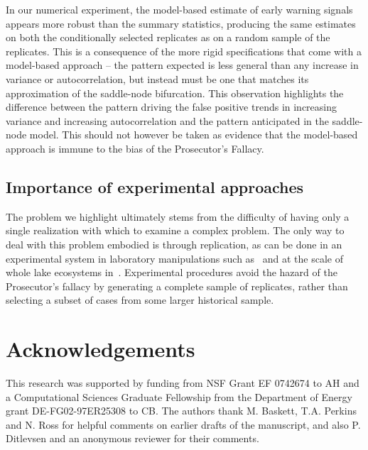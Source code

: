 \documentclass[authoryear,review,12pt]{elsarticle}
\begin{document}
In our numerical experiment, the model-based estimate of early warning
signals appears more robust than the summary statistics, producing
the same estimates on both the conditionally selected replicates as on
a random sample of the replicates.  This is a consequence of the more
rigid specifications that come with a model-based approach -- the pattern
expected is less general than any increase in variance or autocorrelation,
but instead must be one that matches its approximation of the saddle-node
bifurcation. This observation highlights the difference between the
pattern driving the false positive trends in increasing variance and
increasing autocorrelation and the pattern anticipated in the saddle-node
model. This should not however be taken as evidence that the model-based
approach is immune to the bias of the Prosecutor's Fallacy.


\subsection{Importance of experimental approaches} The problem we
highlight ultimately stems from the difficulty of having only a single
realization with which to examine a complex problem.  The only way
to deal with this problem embodied is through replication, as can
be done in an experimental system in laboratory manipulations such
as~\citet{Drake2010, Veraart2011, Dai2012} and at the scale of whole
lake ecosystems in~\citet{Carpenter2011}.  Experimental procedures avoid
the hazard of the Prosecutor's fallacy by generating a complete sample
of replicates, rather than selecting a subset of cases from some larger
historical sample.





 \section{Acknowledgements}
This research was supported by funding from NSF Grant EF 0742674 to AH
and a Computational Sciences Graduate Fellowship from the Department of
Energy grant DE-FG02-97ER25308 to CB. The authors thank M. Baskett, 
T.A. Perkins and N. Ross for helpful comments on earlier drafts of the
manuscript, and also P. Ditlevsen and an anonymous reviewer for their 
comments.  



 
\end{document}
